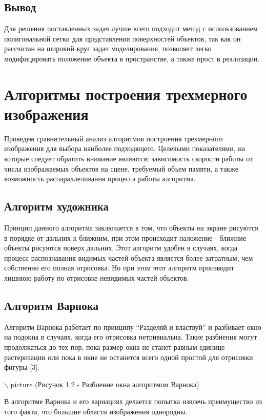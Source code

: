 \subsection{Вывод}

Для решения поставленных задач лучше всего подходит метод с использованием полигональной сетки для представления поверхностей объектов, так как он рассчитан на широкий круг задач моделирования, позволяет легко модифицировать положение объекта в пространстве, а также прост в реализации.

\section{Алгоритмы построения трехмерного изображения}

Проведем сравнительный анализ алгоритмов построения трехмерного изображения для выбора наиболее подходящего. Целевыми показателями, на которые следует обратить внимание являются: зависимость скорости работы от числа изображаемых объектов на сцене, требуемый объем памяти, а также возможность распараллеливания процесса работы алгоритма.

\subsection{Алгоритм художника}

Принцип данного алгоритма заключается в том, что объекты на экране рисуются в порядке от дальних к ближним, при этом происходит наложение - ближние объекты рисуются поверх дальних. Этот алгоритм удобен в случаях, когда процесс распознавания видимых частей объекта является более затратным, чем собственно его полная отрисовка. Но при этом этот алгоритм производит лишнюю работу по отрисовке невидимых частей объектов.

\subsection{Алгоритм Варнока}

Алгоритм Варнока работает по принципу “Разделяй и властвуй” и разбивает окно на подокна в случаях, когда его отрисовка нетривиальна. Такие разбиения могут продолжаться до тех пор, пока размер окна не станет равным единице растеризации или пока в окне не останется всего одной простой для отрисовки фигуры [3].

$\backslash$ picture (Рисунок 1.2 - Разбиение окна алгоритмом Варнока)

В алгоритме Варнока и его вариациях делается попытка извлечь преимущество из того факта, что большие области изображения однородны.

